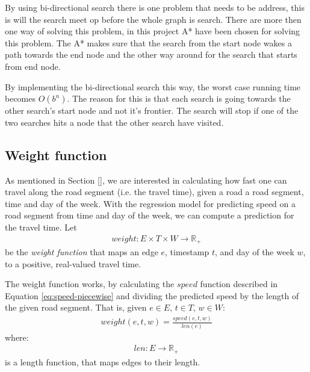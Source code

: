 By using bi-directional search there is one problem that needs to be address, this is will the search meet op before the whole graph is search. There are more then one way of solving this problem, in this project A* have been chosen for solving this problem. The A* makes sure that the search from the start node wakes a path towards the end node and the other way around for the search that starts from end node.

By implementing the bi-directional search this way, the worst case running time becomes $O(b^{n})$. The reason for this is that each search is going towards the other search's start node and not it's frontier. The search will stop if one of the two searches hits a node that the other search have visited.



\subsection{Weight function}\label{sec:weight-function}
As mentioned in Section \ref{}, we are interested in calculating how fast one can travel along the road segment (i.e. the travel time), given a road a road segment, time and day of the week. With the regression model for predicting speed on a road segment from time and day of the week, we can compute a prediction for the travel time. Let
\begin{align}
weight: E \times T \times W \rightarrow \mathbb{R_+}
\end{align}
be the \emph{weight function} that maps an edge $e$, timestamp $t$, and day of the week $w$, to a positive, real-valued travel time.

The weight function works, by calculating the $speed$ function described in Equation \ref{eq:speed-piecewise} and dividing the predicted speed by the length of the given road segment. That is, given $e \in E$, $t \in T$, $w \in W$:
\begin{align}
weight(e,t,w) = \frac{speed(e,t,w)}{len(e)}
\end{align}
where:
\begin{align}
len:E \rightarrow \mathbb{R_+}
\end{align}
is a length function, that maps edges to their length.
